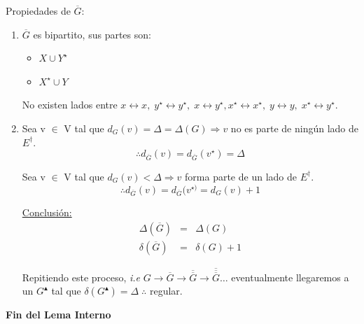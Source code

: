 \documentclass[12pt,a4paper]{report}
\begin{document}
  					\par Propiedades de $\overline{G}$:
  					\begin{enumerate}
  						\item $\overline{G}$ es bipartito, sus partes son:
  							\begin{itemize}
  								\item $X \cup Y^{\star}$
  								\item $X^{\star} \cup Y$
  							\end{itemize}
  							\par No existen lados entre $x \leftrightarrow x, \; y^{\star} \leftrightarrow y^{\star}, \; x \leftrightarrow y^{\star}, x^{\star} \leftrightarrow x^{\star}, \; y \leftrightarrow y, \; x^{\star} \leftrightarrow y^{\star}$.

  						\item Sea v $\in$ V tal que $d_{G}(v) = \Delta = \Delta(G) \Rightarrow v$ no es parte de ningún lado de $E^{\dag}$.
  							\[
  								\therefore d_{\overline{G}}(v) = d_{\overline{G}}(v^{\star}) = \Delta
  							\]

  							\vspace{5mm}
  							\par Sea v $\in$ V tal que $d_{G}(v) < \Delta \Rightarrow v$ forma parte de un lado de $E^{\dag}$.
  							\[
  								\therefore d_{\overline{G}}(v) = d_{\overline{G}}(v^{\star)} = d_{G}(v) + 1
  							\]

  							\vspace{5mm}
  							\par \underline{Conclusión:}
  							\begin{eqnarray}
  								\nonumber \Delta(\overline{G}) &=& \Delta(G) \\
  								\nonumber \delta(\overline{G}) &=& \delta(G) + 1
  							\end{eqnarray}
  							\par Repitiendo este proceso, \textit{i.e} $G \rightarrow \overline{G} \rightarrow \overline{\overline{G}} \rightarrow \overline{\overline{\overline{G}}} \dotsc $ eventualmente llegaremos a un $G^{\blacktriangle}$ tal que $\delta(G^{\blacktriangle}) = \Delta \; \therefore $ regular.
  					\end{enumerate}
  			\par 	\textbf{Fin del Lema Interno}
\end{document}
